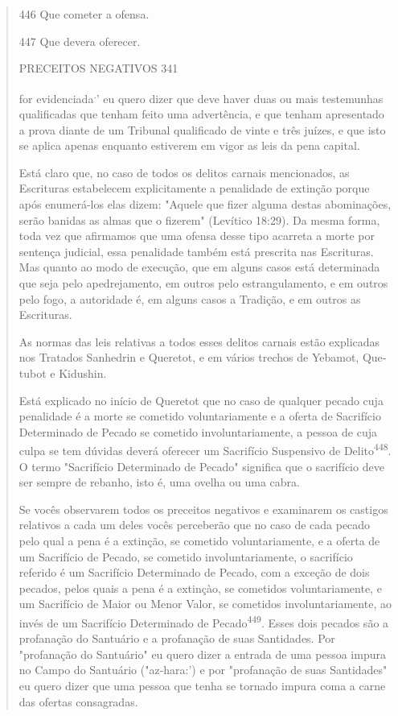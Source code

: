 \begin{quote}
446 Que cometer a ofensa.

447 Que devera oferecer.

PRECEITOS NEGATIVOS 341

for evidenciada\textsuperscript{.}' eu quero dizer que deve haver duas
ou mais testemunhas qua­lificadas que tenham feito uma advertência, e
que tenham apresentado a prova diante de um Tribunal qualificado de
vinte e três juízes, e que isto se aplica apenas enquanto estiverem em
vigor as leis da pena capital.

Está claro que, no caso de todos os delitos carnais mencionados, as
Escrituras estabelecem explicitamente a penalidade de extinção porque
após enumerá-los elas dizem: "Aquele que fizer alguma destas
abominações, serão banidas as almas que o fizerem" (Levítico 18:29). Da
mesma forma, toda vez que afirmamos que uma ofensa desse tipo acarreta a
morte por sentença judi­cial, essa penalidade também está prescrita nas
Escrituras. Mas quanto ao modo de execução, que em alguns casos está
determinada que seja pelo apedrejamento, em outros pelo estrangulamento,
e em outros pelo fogo, a autoridade é, em alguns casos a Tradição, e em
outros as Escrituras.

As normas das leis relativas a todos esses delitos carnais estão
expli­cadas nos Tratados Sanhedrin e Queretot, e em vários trechos de
Yebamot, Que­tubot e Kidushin.

Está explicado no início de Queretot que no caso de qualquer peca­do
cuja penalidade é a morte se cometido voluntariamente e a oferta de
Sacrifí­cio Determinado de Pecado se cometido involuntariamente, a
pessoa de cuja culpa se tem dúvidas deverá oferecer um Sacrifício
Suspensivo de Delito\textsuperscript{448}. O termo "Sacrifício
Determinado de Pecado" significa que o sacrifício deve ser sempre de
rebanho, isto é, uma ovelha ou uma cabra.

Se vocês observarem todos os preceitos negativos e examinarem os
castigos relativos a cada um deles vocês perceberão que no caso de cada
peca­do pelo qual a pena é a extinção, se cometido voluntariamente, e a
oferta de um Sacrifício de Pecado, se cometido involuntariamente, o
sacrifício referido é um Sacrifício Determinado de Pecado, com a exceção
de dois pecados, pelos quais a pena é a extinçào, se cometidos
voluntariamente, e um Sacrifício de Maior ou Menor Valor, se cometidos
involuntariamente, ao invés de um Sacri­fício Determinado de
Pecado\textsuperscript{449}. Esses dois pecados são a profanação do
San­tuário e a profanação de suas Santidades. Por "profanação do
Santuário" eu quero dizer a entrada de uma pessoa impura no Campo do
Santuário ("az-hara:') e por "profanação de suas Santidades" eu quero
dizer que uma pessoa que te­nha se tornado impura coma a carne das
ofertas consagradas.


\end{quote}
